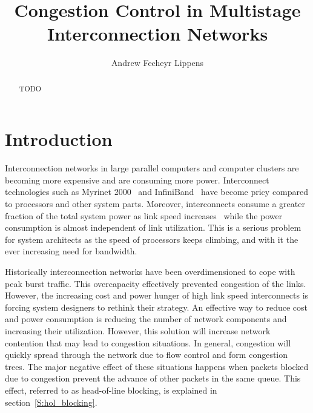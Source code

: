 \documentclass[12pt]{article}
\title{Congestion Control in Multistage Interconnection Networks}
\author{Andrew Fecheyr Lippens}
\date{}
\begin{document}


\newpage
\mbox{}

\maketitle

\begin{abstract}
TODO
\end{abstract}

\setcounter{tocdepth}{2}

\begin{tableofcontents}
\end{tableofcontents}

\newpage

\addtolength{\parskip}{0.5\baselineskip}

\section{Introduction}\label{C:intro}
Interconnection networks in large parallel computers and computer clusters are becoming more expensive and are consuming more power. Interconnect technologies such as Myrinet 2000~\cite{myrinet} and InfiniBand~\cite{infiniband} have become pricy compared to processors and other system parts. Moreover, interconnects consume a greater fraction of the total system power as link speed increases~\cite{SPJ03} while the power consumption is almost independent of link utilization. This is a serious problem for system architects as the speed of processors keeps climbing, and with it the ever increasing need for bandwidth.

Historically interconnection networks have been overdimensioned to cope with peak burst traffic. This overcapacity effectively prevented congestion of the links. However, the increasing cost and power hunger of high link speed interconnects is forcing system designers to rethink their strategy. An effective way to reduce cost and power consumption is reducing the number of network components and increasing their utilization. However, this solution will increase network contention that may lead to congestion situations. In general, congestion will quickly spread through the network due to flow control and form congestion trees. The major negative effect of these situations happens when packets blocked due to congestion prevent the advance of other packets in the same queue. This effect, referred to as head-of-line blocking, is explained in section~\ref{S:hol_blocking}.
\end{document}

